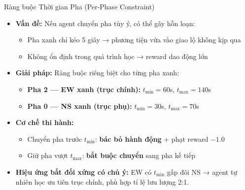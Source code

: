 \begin{frame}{Ràng buộc Thời gian Pha (Per-Phase Constraint)}
\begin{itemize}
    \item \textbf{Vấn đề:} Nếu agent chuyển pha tùy ý, có thể gây hỗn loạn:
    \begin{itemize}
        \item Pha xanh chỉ kéo 5 giây → phương tiện vừa vào giao lộ không kịp qua
        \item Không ổn định trong quá trình học → reward dao động lớn
    \end{itemize}

    \item \textbf{Giải pháp:} Ràng buộc riêng biệt cho từng pha xanh:
    \begin{itemize}
        \item \textbf{Pha 2 — EW xanh (trục chính):} $t_{\min} = 60$s, $t_{\max} = 140$s
        \item \textbf{Pha 0 — NS xanh (trục phụ):} $t_{\min} = 30$s, $t_{\max} = 70$s
    \end{itemize}

    \item \textbf{Cơ chế thi hành:}
    \begin{itemize}
        \item Chuyển pha trước $t_{\min}$: \textbf{bác bỏ hành động} + phạt reward $-1.0$
        \item Giữ pha vượt $t_{\max}$: \textbf{bắt buộc chuyển} sang pha kế tiếp
    \end{itemize}

    \item \textbf{Hiệu ứng bất đối xứng có chủ ý:} EW có $t_{\min}$ gấp đôi NS → agent tự nhiên học ưu tiên trục chính, phù hợp tỉ lệ lưu lượng 2:1.
\end{itemize}
\end{frame}

